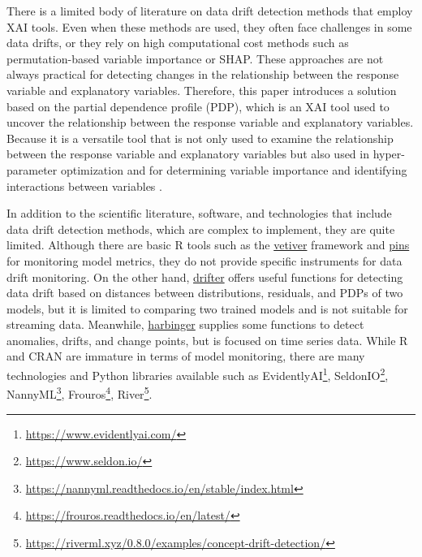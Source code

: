 \documentclass[pdflatex,sn-mathphys-ay]{sn-jnl}%
\theoremstyle{thmstyleone}%
\theoremstyle{thmstyletwo}%
\theoremstyle{thmstylethree}%
\begin{document}
There is a limited body of literature on data drift detection methods that employ XAI tools. Even when these methods are used, they often face challenges in some data drifts, or they rely on high computational cost methods such as permutation-based variable importance or SHAP. These approaches are not always practical for detecting changes in the relationship between the response variable and explanatory variables. Therefore, this paper introduces a solution based on the partial dependence profile (PDP), which is an XAI tool used to uncover the relationship between the response variable and explanatory variables. Because it is a versatile tool that is not only used to examine the relationship between the response variable and explanatory variables but also used in hyper-parameter optimization \citep{moosbauer_et_al_2021} and for determining variable importance and identifying interactions between variables \citep{inglis_et_al_2022}.

In addition to the scientific literature, software, and technologies that include data drift detection methods, which are complex to implement, they are quite limited. Although there are basic R tools such as the \href{https://cran.r-project.org/web/packages/vetiver/index.html}{vetiver} framework and \href{https://cran.r-project.org/package=pins}{pins} for monitoring model metrics, they do not provide specific instruments for data drift monitoring. On the other hand, \href{https://cran.r-project.org/package=drifter}{drifter} offers useful functions for detecting data drift based on distances between distributions, residuals, and PDPs of two models, but it is limited to comparing two trained models and is not suitable for streaming data. Meanwhile, \href{https://cran.r-project.org/package=harbinger}{harbinger} supplies some functions to detect anomalies, drifts, and change points, but is focused on time series data. While R and CRAN are immature in terms of model monitoring, there are many technologies and Python libraries available such as EvidentlyAI\footnote{\href{https://www.evidentlyai.com/}{https://www.evidentlyai.com/}}, SeldonIO\footnote{\href{https://www.seldon.io/}{https://www.seldon.io/}}, NannyML\footnote{\href{https://nannyml.readthedocs.io/en/stable/index.html}{https://nannyml.readthedocs.io/en/stable/index.html}}, Frouros\footnote{\href{https://frouros.readthedocs.io/en/latest/}{https://frouros.readthedocs.io/en/latest/}}, River\footnote{\href{https://riverml.xyz/0.8.0/examples/concept-drift-detection/}{https://riverml.xyz/0.8.0/examples/concept-drift-detection/}}.
\end{document}
